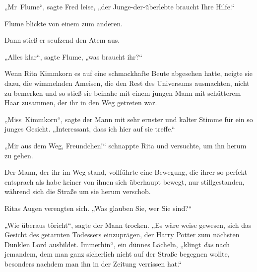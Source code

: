 „Mr~Flume“, sagte Fred leise, „der Junge-der-überlebte braucht Ihre Hilfe.“

Flume blickte von einem zum anderen.

Dann stieß er seufzend den Atem aus.

„Alles klar“, sagte Flume, „was braucht ihr?“


Wenn Rita Kimmkorn es auf eine schmackhafte Beute abgesehen hatte, neigte sie dazu, die wimmelnden Ameisen, die den Rest des Universums ausmachten, nicht zu bemerken und so stieß sie beinahe mit einem jungen Mann mit schütterem Haar zusammen, der ihr in den Weg getreten war.

„Miss~Kimmkorn“, sagte der Mann mit sehr ernster und kalter Stimme für ein so junges Gesicht. „Interessant, dass ich hier auf sie treffe.“

„Mir aus dem Weg, Freundchen!“ schnappte Rita und versuchte, um ihn herum zu gehen.

Der Mann, der ihr im Weg stand, vollführte eine Bewegung, die ihrer so perfekt entsprach als habe keiner von ihnen sich überhaupt bewegt, nur stillgestanden, während sich die Straße um sie herum verschob.

Ritas Augen verengten sich. „Was glauben Sie, wer Sie sind?“

„Wie überaus töricht“, sagte der Mann trocken. „Es wäre weise gewesen, sich das Gesicht des getarnten Todessers einzuprägen, der Harry Potter zum nächsten Dunklen Lord ausbildet. Immerhin“, ein dünnes Lächeln, „klingt \emph{das} nach jemandem, dem man ganz sicherlich nicht auf der Straße begegnen wollte, besonders nachdem man ihn in der Zeitung verrissen hat.“

